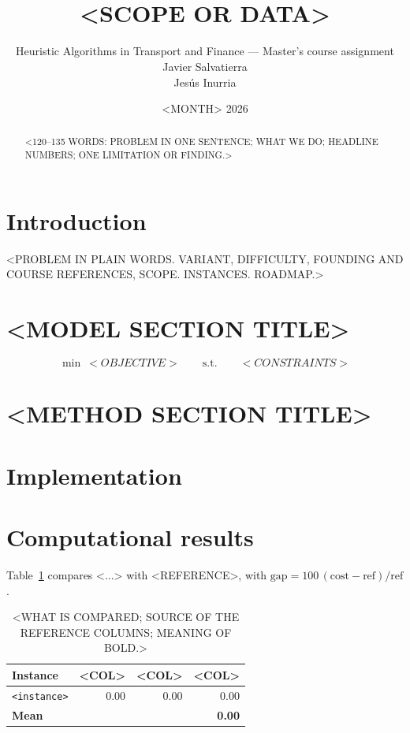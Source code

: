 \documentclass[10pt,a4paper]{article}
\title{\vspace{-1.2cm}\bfseries <PROBLEM AND METHOD>\\
<SCOPE OR DATA>}
\author{Heuristic Algorithms in Transport and Finance --- Master's course assignment \\
    Javier Salvatierra \\
    Jesús Inurria
}
\date{<MONTH> 2026}
\begin{document}
\maketitle
\vspace{-0.8cm}

\begin{abstract}
\noindent\small
<120--135 WORDS: PROBLEM IN ONE SENTENCE; WHAT WE DO; HEADLINE NUMBERS; ONE LIMITATION OR FINDING.>
\end{abstract}

\section{Introduction}

<PROBLEM IN PLAIN WORDS. VARIANT, DIFFICULTY, FOUNDING AND COURSE REFERENCES, SCOPE. INSTANCES. ROADMAP.>

\section{<MODEL SECTION TITLE>}
\label{sec:model}

\begin{equation}
\min\ <OBJECTIVE>
\qquad\text{s.t.}\qquad
<CONSTRAINTS>
\label{eq:model}
\end{equation}

\section{<METHOD SECTION TITLE>}
\label{sec:method}

\section{Implementation}
\label{sec:impl}

\section{Computational results}
\label{sec:res}

Table~\ref{tab:results} compares <...> with <REFERENCE>, with
$\text{gap}=100\,(\text{cost}-\text{ref})/\text{ref}$.

\begin{table}[!t]
\centering
\caption{<WHAT IS COMPARED; SOURCE OF THE REFERENCE COLUMNS; MEANING OF BOLD.>}
\label{tab:results}
\scriptsize
\setlength{\tabcolsep}{4pt}
\begin{tabular}{@{}lrrr@{}}
\toprule
Instance & <COL> & <COL> & <COL> \\
\midrule
\texttt{<instance>} & 0.00 & 0.00 & 0.00 \\
\midrule
\textbf{Mean} & & & \textbf{0.00} \\
\bottomrule
\end{tabular}
\end{table}
\end{document}
